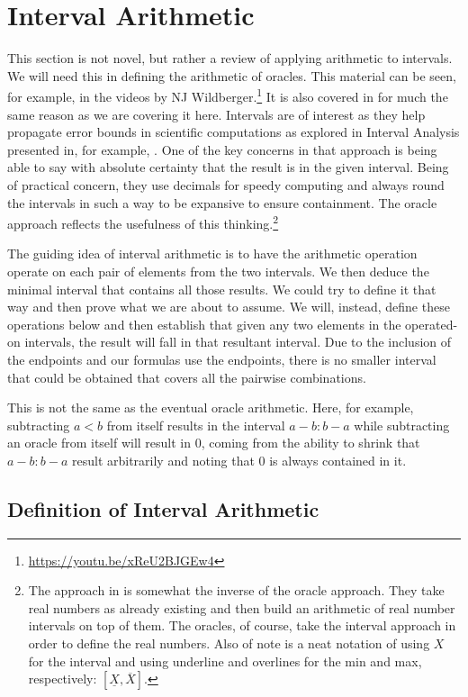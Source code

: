 \documentclass[12pt]{article}
\begin{document}
\section{Interval Arithmetic}

This section is not novel, but rather a review of applying arithmetic to intervals. We will need this in defining the arithmetic of oracles. This material can be seen, for example, in the videos by NJ Wildberger.\footnote{\url{https://youtu.be/xReU2BJGEw4}} It is also covered in \cite{bridger} for much the same reason as we are covering it here. Intervals are of interest as they help propagate error bounds in scientific computations as explored in Interval Analysis presented in, for example, \cite{moore}. One of the key concerns in that approach is being able to say with absolute certainty that the result is in the given interval. Being of practical concern, they use decimals for speedy computing and always round the intervals in such a way to be expansive to ensure containment. The oracle approach reflects the usefulness of this thinking.\footnote{The approach in \cite{moore} is somewhat the inverse of the oracle approach. They take real numbers as already existing and then build an arithmetic of real number intervals on top of them. The oracles, of course, take the interval approach in order to define the real numbers. Also of note is a neat notation of using $X$ for the interval and using underline and overlines for the min and max, respectively: $[\underline X, \overline X]$.} 

The guiding idea of interval arithmetic is to have the arithmetic operation operate on each pair of elements from the two intervals. We then deduce the minimal interval that contains all those results. We could try to define it that way and then prove what we are about to assume. We will, instead, define these operations below and then establish that given any two elements in the operated-on intervals, the result will fall in that resultant interval. Due to the inclusion of the endpoints and our formulas use the endpoints, there is no smaller interval that could be obtained that covers all the pairwise combinations. 

This is not the same as the eventual oracle arithmetic. Here, for example, subtracting $a<b$ from itself results in the interval $a-b:b-a$ while subtracting an oracle from itself will result in $0$, coming from the ability to shrink that $a-b:b-a$ result arbitrarily and noting that $0$ is always contained in it. 

\subsection{Definition of Interval Arithmetic}
\end{document}
